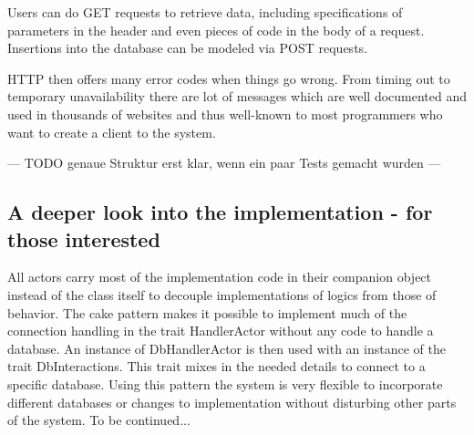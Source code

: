 \documentclass[11p]{scrartcl}
\begin{document}
Users can do GET requests to retrieve data, including specifications of parameters in the header and even pieces of code in the body of a request. Insertions into the database can be modeled via POST requests. 

HTTP then offers many error codes when things go wrong. From timing out to temporary unavailability there are lot of messages which are well documented and used in thousands of websites and thus well-known to most programmers who want to create a client to the system.

--- TODO  genaue Struktur erst klar, wenn ein paar Tests gemacht wurden ---



\subsection{A deeper look into the implementation - for those interested}
All actors carry most of the implementation code in their companion object instead of the class itself to decouple implementations of logics from those of behavior. The cake pattern \cite{link:cakePattern} makes it possible to implement much of the connection handling in the trait HandlerActor without any code to handle a database.  An instance of DbHandlerActor is then used with an instance of the trait DbInteractions. This trait mixes in the needed details to connect to a specific database. Using this pattern the system is very flexible to incorporate different databases or changes to implementation without disturbing other parts of the system. To be continued...
\end{document}
